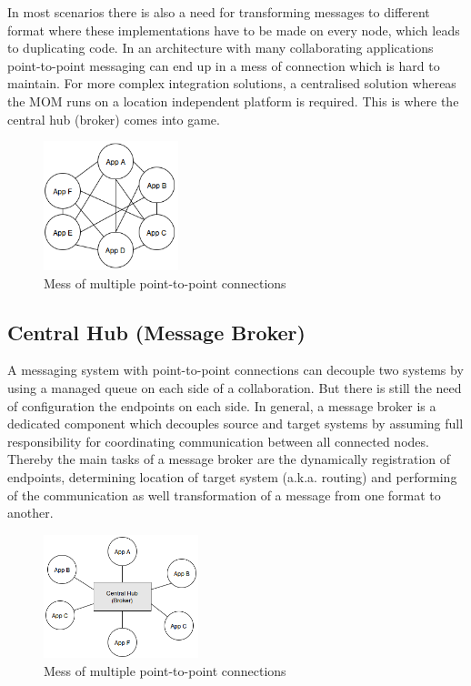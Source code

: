 In most scenarios there is also a need for transforming messages to different
format where these implementations have to be made on every node, which leads to
duplicating code. In an architecture with many collaborating applications
point-to-point messaging can end up in a mess of connection which is hard to
maintain.  For more complex integration solutions, a centralised solution
whereas the MOM runs on a location independent platform is required. This is
where the central hub (broker) comes into game. \cite{MSDNIntegration}

\begin{figure}[H]
    \centering
    \includegraphics[width=0.35\textwidth]{images/point-to-point-messaging.png}
    \caption{Mess of multiple point-to-point connections}
    \label{fig:point-to-point-messaging}
\end{figure}

\subsection{Central Hub (Message Broker)}
\label{intro-messaging-broker}
A messaging system with point-to-point connections can decouple two systems
by using a managed queue on each side of a collaboration. But there is
still the need of configuration the endpoints on each side. In general, a
message broker is a dedicated component which decouples source and
target systems by assuming full responsibility for coordinating communication between
all connected nodes. Thereby the main tasks of a message broker are the
dynamically registration of endpoints, determining location of target system
(a.k.a. routing) and performing of the communication as well transformation of a
message from one format to another.\cite{MSDNIntegration} \\

\begin{figure}[H]
    \centering
    \includegraphics[width=0.4\textwidth]{images/central-hub.png}
    \caption{Mess of multiple point-to-point connections}
    \label{fig:central-hub}
\end{figure}

